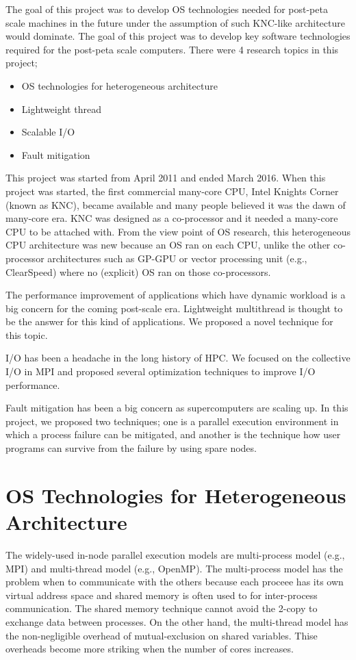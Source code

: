 The goal of this project was to develop OS technologies needed for
post-peta scale machines in the future under the assumption of such
KNC-like architecture would dominate. The goal of this project was to
develop key software technologies required for the post-peta scale
computers. There were 4 research topics in this project;

\begin{itemize}
\item OS technologies for heterogeneous architecture
\item Lightweight thread
\item Scalable I/O
\item Fault mitigation
\end{itemize}

This project was started from April 2011 and ended March 2016. When
this project was started, the first commercial many-core CPU, Intel
Knights Corner (known as KNC)\cite{overview-xeon-phi}, became
available and many people 
believed it was the dawn of many-core era. KNC was designed as a
co-processor and it needed a many-core CPU to be attached with. From
the view point of OS research, this heterogeneous CPU architecture was
new because an OS ran on each CPU, unlike the other co-processor
architectures such as GP-GPU or vector processing unit (e.g.,
ClearSpeed) where no (explicit) OS ran on those co-processors. 

The performance improvement of applications which have dynamic
workload is a big concern for the coming post-scale era. Lightweight
multithread is thought to be the answer for this kind of
applications. We proposed a novel technique for this topic.

I/O has been a headache in the long history of HPC. We focused on the
collective I/O in MPI and proposed several optimization techniques to
improve I/O performance.

Fault mitigation has been a big concern as supercomputers are scaling
up. In this project, we proposed two techniques; one is a parallel
execution environment in which a process failure can be mitigated, and
another is the technique how user programs can survive from the
failure by using spare nodes.

\section{OS Technologies for Heterogeneous Architecture}

The widely-used in-node parallel execution models are
multi-process model (e.g., MPI) and multi-thread model (e.g.,
OpenMP). The multi-process model has the problem when to communicate
with the others because each proceee has its own virtual address space
and shared memory is often used to for inter-process
communication. The shared memory technique cannot avoid the 2-copy to
exchange data between processes. On the other hand, the multi-thread
model has the non-negligible overhead of mutual-exclusion on shared
variables. Thise overheads become more striking when the number of
cores increases.  

